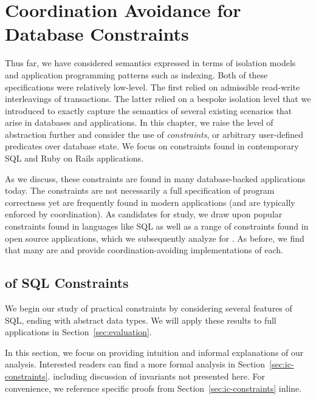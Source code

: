 
\chapter{Coordination Avoidance for Database Constraints}
\label{c.constraints}

Thus far, we have considered semantics expressed in terms of isolation
models and application programming patterns such as indexing. Both of
these specifications were relatively low-level. The first relied on
admissible read-write interleavings of transactions. The latter relied
on a bespoke isolation level that we introduced to exactly capture the
semantics of several existing scenarios that arise in databases and applications. In this chapter, we raise
the level of abstraction further and consider the use of
\textit{constraints}, or arbitrary user-defined predicates over
database state. We focus on constraints found in contemporary SQL and
Ruby on Rails applications.

As we discuss, these constraints are found in many database-backed
applications today. The constraints are not necessarily a full
specification of program correctness yet are frequently found in
modern applications (and are typically enforced by coordination). As candidates
for study, we draw upon popular constraints found in languages like
SQL as well as a range of constraints found in open source
applications, which we subsequently analyze for \iconfluence. As
before, we find that many are \iconfluent and provide
coordination-avoiding implementations of each.

\section{\IConfluence of SQL Constraints}
\label{sec:bcc-practice}
\label{sec:merge}

We begin our study of practical constraints by considering several
features of SQL, ending with abstract data types. We will apply these
results to full applications in Section~\ref{sec:evaluation}.

In this section, we focus on providing intuition and informal
explanations of our \iconfluence analysis. Interested readers can find
a more formal analysis in Section~\ref{sec:ic-constraints}.
including discussion of invariants not presented here. For convenience,
we reference specific proofs from Section~\ref{sec:ic-constraints} inline.



